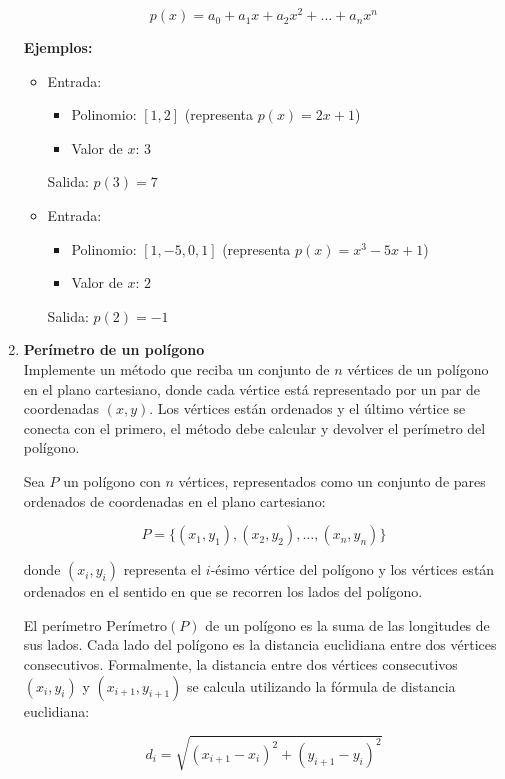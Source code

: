 \begin{enumerate}
    \[
    p(x) = a_0 + a_1 x + a_2 x^2 + \dots + a_n x^n
    \]

    \textbf{Ejemplos:}
    \begin{itemize}
        \item Entrada:
        \begin{itemize}
            \item Polinomio: \([1, 2]\) (representa \(p(x) = 2x + 1\))
            \item Valor de \(x\): \(3\)
        \end{itemize}
        Salida: \( p(3) = 7 \)
        
        \item Entrada:
        \begin{itemize}
            \item Polinomio: \([1, -5, 0, 1]\) (representa \(p(x) = x^3 - 5x + 1\))
            \item Valor de \(x\): \(2\)
        \end{itemize}
        Salida: \( p(2) = -1 \)
    \end{itemize}
    
    \item \textbf{Perímetro de un polígono}\\
    Implemente un método que reciba un conjunto de \(n\) vértices de un polígono en el plano cartesiano, donde cada vértice está representado por un par de coordenadas \((x, y)\). Los vértices están ordenados y el último vértice se conecta con el primero, el método debe calcular y devolver el perímetro del polígono.
        
    Sea \( P \) un polígono con \( n \) vértices, representados como un conjunto de pares ordenados de coordenadas en el plano cartesiano:

    \[
    P = \{ (x_1, y_1), (x_2, y_2), \dots, (x_n, y_n) \}
    \]
    
    donde \( (x_i, y_i) \) representa el \( i \)-ésimo vértice del polígono y los vértices están ordenados en el sentido en que se recorren los lados del polígono. 
    
    El perímetro \( \text{Perímetro}(P) \) de un polígono es la suma de las longitudes de sus lados. Cada lado del polígono es la distancia euclidiana entre dos vértices consecutivos. Formalmente, la distancia entre dos vértices consecutivos \( (x_i, y_i) \) y \( (x_{i+1}, y_{i+1}) \) se calcula utilizando la fórmula de distancia euclidiana:
    
    \[
    d_i = \sqrt{(x_{i+1} - x_i)^2 + (y_{i+1} - y_i)^2}
    \]
    

\end{enumerate}
